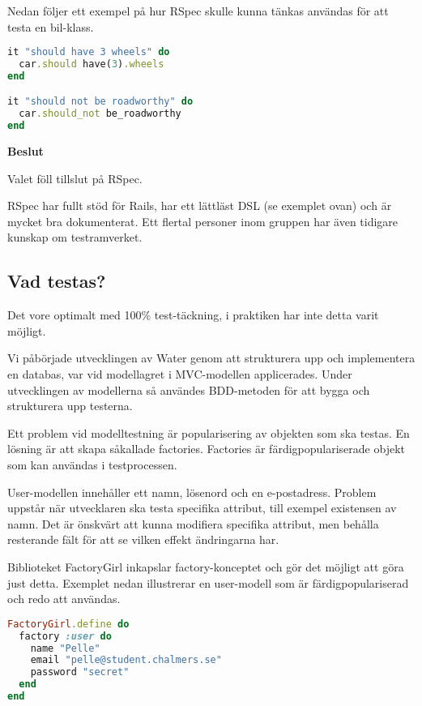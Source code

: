 Nedan följer ett exempel på hur RSpec skulle kunna tänkas användas för att testa en bil-klass.

\begin{lstlisting}[language=Ruby, showstringspaces=false]
it "should have 3 wheels" do
  car.should have(3).wheels
end

it "should not be roadworthy" do
  car.should_not be_roadworthy
end
\end{lstlisting}

\begin{flushright}
  
  \textbf{Beslut}
  
    Valet föll tillslut på RSpec.

    RSpec har fullt stöd för Rails, har ett lättläst DSL (se exemplet ovan) och är mycket bra dokumenterat. Ett flertal personer inom gruppen har även tidigare kunskap om testramverket.
\end{flushright}

\subsection{Vad testas?}
Det vore optimalt med 100\% test-täckning, i praktiken har inte detta varit möjligt.

Vi påbörjade utvecklingen av Water genom att strukturera upp och implementera en databas, var vid modellagret i MVC-modellen applicerades. Under utvecklingen av modellerna så användes BDD-metoden för att bygga och strukturera upp testerna. 

Ett problem vid modelltestning är popularisering av objekten som ska testas. En lösning är att skapa såkallade factories. Factories är färdigpopulariserade objekt som kan användas i testprocessen.

User-modellen innehåller ett namn, lösenord och en e-postadress. Problem uppstår när utvecklaren ska testa specifika attribut, till exempel existensen av namn. Det är önskvärt att kunna modifiera specifika attribut, men behålla resterande fält för att se vilken effekt ändringarna har.

Biblioteket FactoryGirl inkapslar factory-konceptet och gör det möjligt att göra just detta. Exemplet nedan illustrerar en user-modell som är färdigpopulariserad och redo att användas.

\begin{lstlisting}[language=Ruby]
FactoryGirl.define do
  factory :user do
    name "Pelle"
    email "pelle@student.chalmers.se"
    password "secret"
  end
end
\end{lstlisting}


